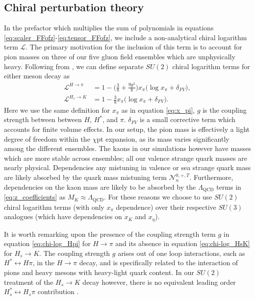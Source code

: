 \subsection{Chiral perturbation theory}\label{sec:chi-pt}
In the prefactor which multiplies the sum of polynomials in equations \ref{eq:scaler_FFofz}-\ref{eq:tensor_FFofz}, we include a non-analytical chiral logarithm term $\mathcal{L}$.  The primary motivation for the inclusion of this term is to account for pion masses on three of our five gluon field ensembles which are unphysically heavy.  Following from \cite{BIJNENS201054, BIJNENS2011145}, we can define separate $SU(2)$ chiral logarithm terms for either meson decay as
\begin{align}
        \label{eq:chi-log_Hpi}
        \mathcal{L}^{H\rightarrow \pi} &= 1 - \Big(\frac{3}{8}+\frac{9{g}^2}{8}\Big){x_{\pi}}\Big(\log{x_{\pi}}+\delta_{FV}\Big),\\
        \label{eq:chi-log_HsK}
        {\mathcal{L}^{H_s\rightarrow K}} &= 1 - \frac{3}{8}{x_{\pi}}\Big(\log {x_{\pi}}+\delta_{FV}\Big). 
    \end{align}
Here we use the same definition for $x_\pi$ as in equation \ref{eq:x_pi}, $g$ is the coupling strength between between $H$, $H^*$, and $\pi$. $\delta_{FV}$ is a small corrective term which accounts for finite volume effects. In our setup, the pion mass is effectively a light degree of freedom within the $\chi$pt expansion, as its mass varies significantly among the different ensembles.  The kaons in our simulations however have masses which are more stable across ensembles; all our valence strange quark masses are nearly physical. Dependencies any mistuning in valence or sea strange quark mass are likely absorbed by the quark mass mistuning term $\mathcal{N}_n^{0,+,T}$.  Furthermore, dependencies on the kaon mass are likely to be absorbed by the $\Lambda_\mathrm{QCD}$ terms in \ref{eq:z_coefficients} as $M_K \approx \Lambda_\mathrm{QCD}$.  For these reasons we choose to use $SU(2)$ chiral logarithm terms (with only $x_\pi$ dependence) over their respective $SU(3)$ analogues (which have dependencies on $x_K$ and $x_\eta$).  

It is worth remarking upon the presence of the coupling strength term $g$ in equation \ref{eq:chi-log_Hpi} for $H\rightarrow\pi$ and its absence in equation \ref{eq:chi-log_HsK} for $H_s \rightarrow K$.  The coupling strength $g$ arises out of one loop interactions, such as $H^*\leftrightarrow H\pi$, in the $H\rightarrow \pi$ decay, and is specifically related to the interaction of pions and heavy mesons with heavy-light quark content.  In our $SU(2)$ treatment of the $H_s\rightarrow K$ decay however, there is no equivalent leading order $H_s^*\leftrightarrow H_s\pi$ contribution \cite{PhysRevD.85.114506, PhysRevD.76.014002}. 



